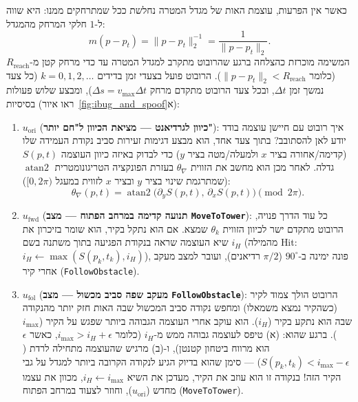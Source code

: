 \documentclass[11pt, a4paper]{article}
\begin{document}
כאשר אין הפרעות, עוצמת האות של מגדל המטרה נחלשת ככל שמתרחקים ממנו: היא שווה ל-$1$ חלקי המרחק מהמגדל:
\begin{equation*}
    m(p - p_t) = \|p - p_t\|_2^{-1} = \frac{1}{\|p - p_t\|_2}.
\end{equation*}
המשימה מוכרזת כהצלחה ברגע שהרובוט מתקרב למגדל המטרה עד כדי מרחק קטן מ-$R_{\text{reach}}$ (כלומר $\|p - p_t\|_2 < R_{\text{reach}}$). הרובוט פועל בצעדי זמן בדידים $k = 0, 1, 2, \dots$ (כל צעד נמשך זמן $\Delta t$, ובכל צעד הרובוט מתקדם מרחק $\Delta s = v_{\max}\Delta t$), ומבצע שלוש פעולות בסיסיות (ראו איור~\ref{fig:ibug_and_spoof}א):
\begin{enumerate}
    \item $u_{\text{ori}}$ (\textbf{כיוון לגרדיאנט — מציאת הכיוון ל"חם יותר"}): איך רובוט עם חיישן עוצמה בודד יודע לאן להסתובב? בתוך צעד אחד, הוא מבצע דגימות זעירות סביב נקודת העמידה שלו (קדימה/אחורה בציר $x$ ולמעלה/מטה בציר $y$) כדי לבדוק באיזה כיוון העוצמה $S(p, t)$ גדלה. לאחר מכן הוא מחשב את הזווית $\theta_{\nabla}$ בעזרת הפונקציה הטריגונומטרית $\operatorname{atan2}$ (שמתרגמת שינוי בציר $y$ ובציר $x$ לזווית במעגל $[0, 2\pi)$):
    \begin{equation}
        \theta_{\nabla}(p, t) = \operatorname{atan2}\!\bigl(\partial_y S(p, t),\, \partial_x S(p, t)\bigr) \pmod{2\pi}.
        \label{eq:grad_angle}
    \end{equation}
    \item $u_{\text{fwd}}$ (\textbf{תנועה קדימה במרחב הפתוח — מצב \foreignlanguage{english}{\texttt{MoveToTower}}}): כל עוד הדרך פנויה, הרובוט מתקדם ישר לכיוון הזווית $\theta_k$ שמצא. אם הוא נתקל בקיר, הוא שומר בזיכרון את שיא העוצמה שראה בנקודת הפגיעה בתוך משתנה בשם $i_H$ (מהמילה \foreignlanguage{english}{Hit}: $i_H \leftarrow \max(S(p_k, t_k), i_H)$), פונה ימינה ב-$90^\circ$ ($\pi/2$ רדיאנים), ועובר למצב מעקב אחרי קיר (\foreignlanguage{english}{\texttt{FollowObstacle}}).
    \item $u_{\text{fol}}$ (\textbf{מעקב שפה סביב מכשול — מצב \foreignlanguage{english}{\texttt{FollowObstacle}}}): הרובוט הולך צמוד לקיר (כשהקיר נמצא משמאלו) ומחפש נקודה סביב המכשול שבה האות חזק יותר מהנקודה שבה הוא נתקע בקיר ($i_H$). הוא עוקב אחרי העוצמה הגבוהה ביותר שפגש על הקיר ($i_{\text{max}}$). ברגע שהוא: (א) טיפס לעוצמה גבוהה ממש מ-$i_H$ (כלומר $i_{\text{max}} > i_H + \epsilon$, כאשר $\epsilon$ הוא מרווח ביטחון קטנטן), ו-(ב) מרגיש שהעוצמה מתחילה לרדת ($S(p_k, t_k) < i_{\text{max}} - \epsilon$) — סימן שהוא בדיוק הגיע לנקודה הקרובה ביותר למגדל על גבי הקיר הזה! בנקודה זו הוא עוזב את הקיר, מעדכן את השיא $i_H \leftarrow i_{\text{max}}$, מכוון את עצמו מחדש ($u_{\text{ori}}$), וחוזר לצעוד במרחב הפתוח (\foreignlanguage{english}{\texttt{MoveToTower}}).
\end{enumerate}
\end{document}
